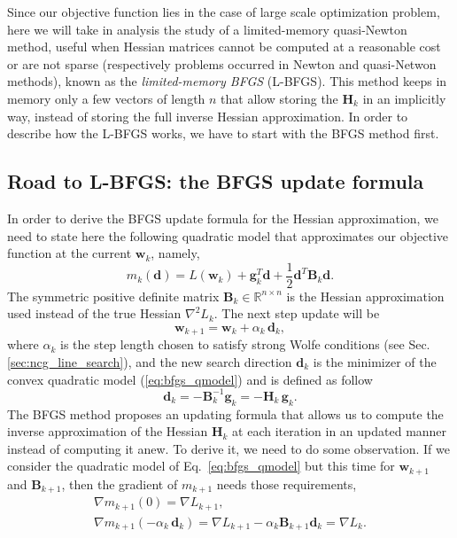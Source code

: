 \documentclass[11pt]{article}
\begin{document}
Since our objective function lies in the case of large scale optimization problem, here we will take in analysis the study of a limited-memory quasi-Newton method, useful when Hessian matrices cannot be computed at a reasonable cost or are not sparse (respectively problems occurred in Newton and quasi-Netwon methods), known as the \emph{limited-memory BFGS} (L-BFGS). This method keeps in memory only a few vectors of length $n$ that allow storing the $\mathbf{H}_k$ in an implicitly way, instead of storing the full inverse Hessian approximation. In order to describe how the L-BFGS works, we have to start with the BFGS method first.

\subsection{Road to L-BFGS: the BFGS update formula}
\label{sec:bfgs_road_to}
In order to derive the BFGS update formula for the Hessian approximation, we need to state here the following quadratic model that approximates our objective function at the current $\mathbf{w}_k$, namely,
\begin{equation}
\label{eq:bfgs_qmodel}
    m_k(\mathbf{d}) = L(\mathbf{w}_k) + \mathbf{g}_k^T \mathbf{d} +\frac{1}{2}\mathbf{d}^T\mathbf{B}_k\mathbf{d}.
\end{equation}
The symmetric positive definite matrix  $\mathbf{B}_k \in \mathbb{R}^{n \times n}$ is the Hessian approximation used instead of the true Hessian  $\nabla^2 L_k$. The next step  update will be
\begin{equation}
    \mathbf{w}_{k+1}=\mathbf{w}_k + \alpha_k \, \mathbf{d}_k,
    \label{eq:bfgs_update}
\end{equation}
where $\alpha_k$ is the step length chosen to satisfy strong Wolfe conditions (see Sec. \ref{sec:ncg_line_search}), and the new search direction $\mathbf{d}_k$ is the minimizer of the convex quadratic model (\ref{eq:bfgs_qmodel}) and is defined as follow
\begin{equation}
    \mathbf{d}_k =  - \mathbf{B}_k^{-1}\mathbf{g}_k = - \mathbf{H}_k \, \mathbf{g}_k.
    \label{eq:d_bfgs}
\end{equation}
The BFGS method proposes an updating formula that allows us to compute the inverse approximation of the Hessian $\mathbf{H}_k$ at each iteration in an updated manner instead of computing it anew. To derive it, we need to do some observation. If we consider the quadratic model of Eq.~\ref{eq:bfgs_qmodel} but this time for $\mathbf{w}_{k+1}$ and $\mathbf{B}_{k+1}$, then the gradient of $m_{k+1}$ needs those requirements,
\begin{subequations}
\begin{gather}
    \nabla m_{k+1}(0) = \nabla L_{k+1},\label{eq:bfgs_cond1}\\
    \nabla m_{k+1}(-\alpha_k \, \mathbf{d}_k) = \nabla L_{k+1} -\alpha_k \mathbf{B}_{k+1}\mathbf{d}_k = \nabla L_{k}.
    \label{eq:bfgs_cond2}
\end{gather}
\end{subequations}
\end{document}
